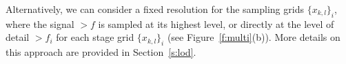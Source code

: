 Alternatively, we can consider a fixed resolution for the sampling grids \(\{x_{k,l}\}_i\), where the signal \(\gt{f}\) is sampled at its highest level, or directly at the level of detail \(\gt{f}_i\) for each stage grid \(\{x_{k,l}\}_i\) (see Figure~\ref{f:multi}(b)). More details on this approach are provided in Section~\ref{s:lod}.



